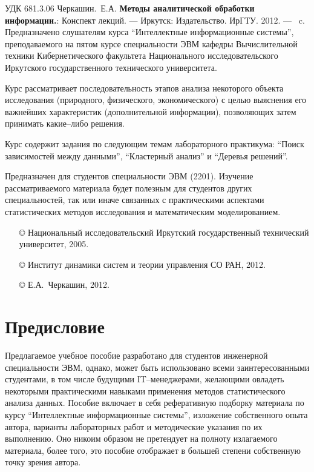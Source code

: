 \documentclass[12pt, openany, twoside]{book} %
\newenvironment{mygroup}{}{}
\begin{document}
\newpage
\begin{mygroup}
\thispagestyle{empty}
\noindent УДК 681.3.06
\vfill\footnotesize
{Черкашин.~Е.А.} {\bf Методы аналитической обработки информации.}: Конспект лекций. ---
Иркутск: Издательство. ИрГТУ. 2012. --- \pageref{pg:lastpage}~c.
\vfill
Предназначено слушателям курса
``Интеллектные информационные системы'', преподаваемого на пятом курсе
специальности ЭВМ кафедры Вычислительной техники Кибернетического факультета
Национального исследовательского Иркутского государственного технического университета.

Курс рассматривает последовательность этапов анализа некоторого объекта исследования (природного, физического, экономического) с целью выяснения его важнейших  характеристик (дополнительной информации), позволяющих затем принимать какие--либо решения.

Курс содержит задания по следующим темам лабораторного практикума: ``Поиск зависимостей между данными'', ``Кластерный анализ'' и ``Деревья решений''.

Предназначен для студентов специальности ЭВМ (2201). Изучение рассматриваемого материала будет полезным для студентов других специальностей, так или иначе связанных с практическими аспектами статистических методов исследования и математическим моделированием.

\vfill\vfill

\vfill
\hbox{}\hfill
\begin{minipage}{0.6\linewidth}
\begin{itemize}
\setlength{\itemsep}{0pt}
\setlength{\parsep}{0pt}
\item[\copyright{}] Национальный исследовательский Иркутский государственный технический университет, 2005.\item[\copyright{}] Институт динамики систем и теории управления СО РАН, 2012.
\item[\copyright{}] Е.А.~Черкашин, 2012.
\end{itemize}
\end{minipage}
\end{mygroup}
\tableofcontents
\clearpage

\newpage
\section*{Предисловие}
\thispagestyle{empty}

Предлагаемое учебное пособие разработано для студентов  инженерной специальности ЭВМ, однако, может быть использовано всеми заинтересованными студентами, в том числе будущими IT--менеджерами, желающими овладеть некоторыми практическими навыками применения методов статистического анализа данных. Пособие включает в себя рефе\-ра\-тив\-ную подборку материала по курсу ``Интеллектные информационные системы'', изложение собственного опыта автора, варианты лабораторных работ и методические указания по их выполнению. Оно никоим образом не претендует на полноту излагаемого материала, более того, это пособие отображает в большей степени собственную точку зрения автора.
\end{document}
